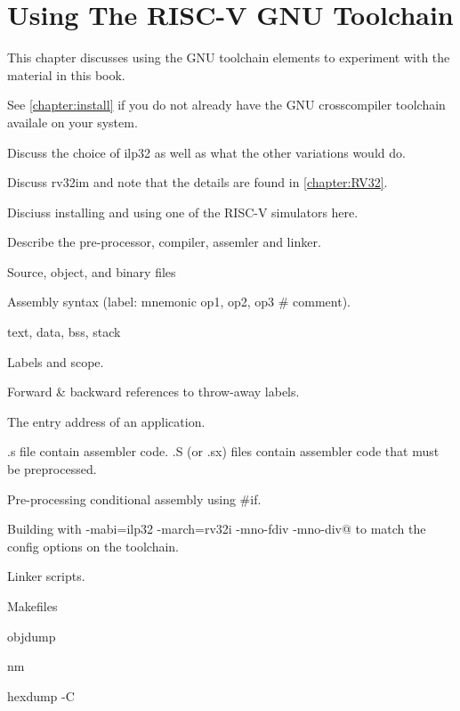 \chapter{Using The RISC-V GNU Toolchain}

This chapter discusses using the GNU toolchain elements to
experiment with the material in this book.

See \autoref{chapter:install} if you do not already have the 
GNU crosscompiler toolchain availale on your system.


Discuss the choice of ilp32 as well as what the other variations would do.

Discuss rv32im and note that the details are found in \autoref{chapter:RV32}.

Disciuss installing and using one of the RISC-V simulators 
here.

Describe the pre-processor, compiler, assemler and linker.

Source, object, and binary files

Assembly syntax (label: mnemonic op1, op2, op3  \# comment).

text, data, bss, stack

Labels and scope.

Forward \& backward references to throw-away labels.

The entry address of an application.

.s file contain assembler code.
.S (or .sx) files contain assembler code that must be preprocessed.~\cite[p.~29]{gcc:2017}

Pre-processing conditional assembly using \#if.

Building with \verb@-mabi=ilp32 -march=rv32i -mno-fdiv -mno-div@ to match
the config options on the toolchain.  

Linker scripts.

Makefiles

objdump

nm

hexdump -C
